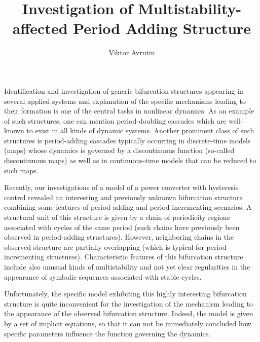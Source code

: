 \documentclass[10pt]{article}
\begin{document}

\title{Investigation of Multistability-affected Period Adding Structure}
\author{Viktor Avrutin}
\date{}
\maketitle

Identification and investigation of generic bifurcation structures
appearing in several applied systems and explanation of the specific
mechanisms leading to their formation is one of the central tasks in
nonlinear dynamics.  As an example of such structures, one can mention
period-doubling cascades which are well-known to exist in all kinds of
dynamic systems.  Another prominent class of such structures is
period-adding cascades typically occurring in discrete-time models
(maps) whose dynamics is governed by a discontinuous function
(so-called discontinuous maps) as well as in continuous-time models
that can be reduced to such maps.

Recently, our investigations of a model of a power converter with
hysteresis control revealed an interesting and previously unknown
bifurcation structure combining some features of period adding and
period incrementing scenarios.  A structural unit of this structure is
given by a chain of periodicity regions associated with cycles of the
same period (such chains have previously been observed in
period-adding structures).  However, neighboring chains in the
observed structure are partially overlapping (which is typical for
period incrementing structures).  Characteristic features of this
bifurcation structure include also unusual kinds of multistability and
not yet clear regularities in the appearance of symbolic sequences
associated with stable cycles.

Unfortunately, the specific model exhibiting this highly interesting
bifurcation structure is quite inconvenient for the investigation of
the mechanism leading to the appearance of the observed bifurcation
structure. Indeed, the model is given by a set of implicit equations,
so that it can not be immediately concluded how specific parameters
influence the function governing the dynamics.
\end{document}

